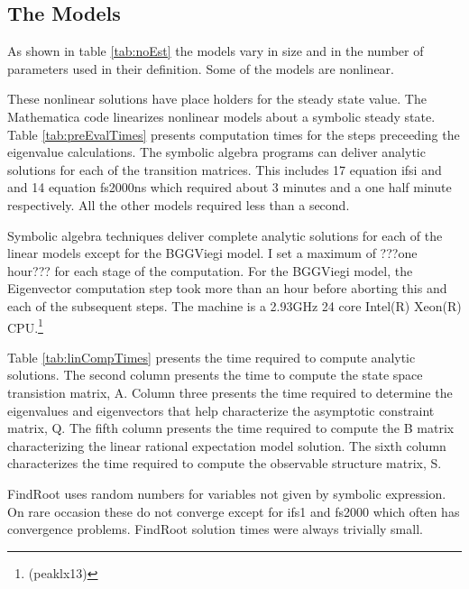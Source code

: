 \documentclass{beamer}
\begin{document}
  \begin{frame}

    \subsection{The Models }
As shown in table \ref{tab:noEst} the models vary in size and in the number of parameters used in their
definition. Some of the models are nonlinear.

%

  These nonlinear solutions have place holders for the steady state value.
The Mathematica code linearizes nonlinear models about a symbolic steady state.
Table \ref{tab:preEvalTimes} presents computation times for the steps
preceeding the eigenvalue calculations.
The symbolic algebra programs can deliver analytic solutions for
each of the transition matrices. This includes 17 equation ifsi and and 14 equation fs2000ns which required
about 3 minutes and a one half minute respectively. All the other models required less than a second.



%



Symbolic algebra techniques deliver complete 
analytic solutions for each of the linear
models except for the BGGViegi model. 
I set a maximum of ???one hour??? for each stage of the computation.
For the BGGViegi model, the Eigenvector computation 
step took more than an hour before aborting this and each of the subsequent 
steps.  
The machine is a 2.93GHz  24 core
Intel(R) Xeon(R) CPU.\footnote{(peaklx13)}

%

%

Table \ref{tab:linCompTimes} presents the time required to compute analytic 
solutions. 
The second column presents the time to compute the state space 
transistion matrix, A. Column three presents the time required to determine
the eigenvalues and eigenvectors that help characterize the asymptotic
constraint matrix, Q. The fifth column presents the time required to
compute the B matrix characterizing the linear rational expectation  model
solution.  The sixth column characterizes the time required to compute
the observable structure matrix, S.  

FindRoot uses random numbers for variables not given by symbolic expression.
On rare occasion these do not converge except for ifs1 and fs2000
 which often has convergence problems. 
FindRoot solution times were always trivially small.


\end{frame}
\end{document}
